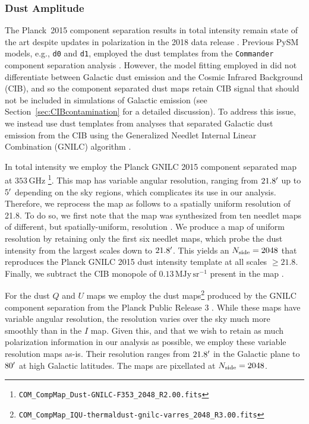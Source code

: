 \documentclass[twocolumn]{aastex631}
\begin{document}
\subsubsection{Dust Amplitude}\label{sec:dustamplitude}
The Planck~2015 component separation results in total intensity remain state of the art despite updates in polarization in the 2018 data release \citep{planck2016-l04}. Previous PySM models, e.g., \texttt{d0} and \texttt{d1}, employed the dust templates from the \texttt{Commander} component separation analysis \citep{planck2014-a11}. However, the model fitting employed in \citet{planck2014-a11} did not differentiate between Galactic dust emission and the Cosmic Infrared Background (CIB), and so the component separated dust maps retain CIB signal that should not be included in simulations of Galactic emission (see Section~\ref{sec:CIBcontamination} for a detailed discussion). To address this issue, we instead use dust templates from analyses that separated Galactic dust emission from the CIB using the Generalized Needlet Internal Linear Combination (GNILC) algorithm \citep{Remazeilles:2011}. 

In total intensity we employ the Planck GNILC 2015 component separated map at $353$\,GHz \citep{planck2016-XLVIII}\footnote{\texttt{COM\_CompMap\_Dust-GNILC-F353\_2048\_R2.00.fits}}. This map has variable angular resolution, ranging from $21.8\mbox{$^\prime$}$ up to $5\mbox{$^\prime$}$ depending on the sky regions, which complicates its use in our analysis. Therefore, we reprocess the map as follows to a spatially uniform resolution of 21.8\arcmin. To do so, we first note that the map was synthesized from ten needlet maps of different, but spatially-uniform, resolution \citep[][Figure~A.2]{planck2016-l04}. We produce a map of uniform resolution by retaining only the first six needlet maps, which probe the dust intensity from the largest scales down to $21.8\mbox{$^\prime$}$. This yields an $N_{\rm side} = 2048$ that reproduces the Planck GNILC 2015 dust intensity template at all scales $\geq 21.8$\arcmin. Finally, we subtract the CIB monopole of $0.13\, \text{MJy}\,\text{sr}^{-1}$ present in the map \citep[][Section~2.2]{planck2016-l11B}.

For the dust $Q$ and $U$ maps we employ the dust maps\footnote{\texttt{COM\_CompMap\_IQU-thermaldust-gnilc-varres\_2048\_R3.00.fits}} produced by the GNILC component separation from the Planck Public Release 3 \citep{planck2016-l04,planck2016-l11B}. While these maps have variable angular resolution, the resolution varies over the sky much more smoothly than in the $I$ map. Given this, and that we wish to retain as much polarization information in our analysis as possible, we employ these variable resolution maps as-is. Their resolution ranges from $21.8\mbox{$^\prime$}$ in the Galactic plane to $80\mbox{$^\prime$}$ at high Galactic latitudes. The maps are pixellated at $N_{\rm side} = 2048$. 
\end{document}
